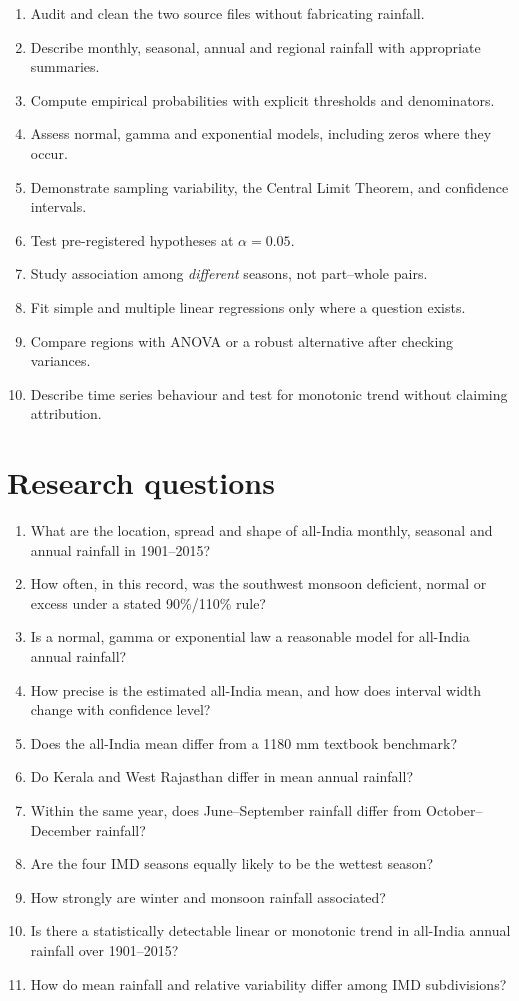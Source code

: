 \documentclass[
]{article}
\providecommand{\tightlist}{%
  \setlength{\itemsep}{0pt}\setlength{\parskip}{0pt}}
\begin{document}
\begin{enumerate}
\def\labelenumi{\arabic{enumi}.}
\tightlist
\item
  Audit and clean the two source files without fabricating rainfall.
\item
  Describe monthly, seasonal, annual and regional rainfall with
  appropriate summaries.
\item
  Compute empirical probabilities with explicit thresholds and
  denominators.
\item
  Assess normal, gamma and exponential models, including zeros where
  they occur.
\item
  Demonstrate sampling variability, the Central Limit Theorem, and
  confidence intervals.
\item
  Test pre-registered hypotheses at \(\alpha = 0.05\).
\item
  Study association among \emph{different} seasons, not part--whole
  pairs.
\item
  Fit simple and multiple linear regressions only where a question
  exists.
\item
  Compare regions with ANOVA or a robust alternative after checking
  variances.
\item
  Describe time series behaviour and test for monotonic trend without
  claiming attribution.
\end{enumerate}

\section{Research questions}\label{research-questions}

\begin{enumerate}
\def\labelenumi{\arabic{enumi}.}
\tightlist
\item
  What are the location, spread and shape of all-India monthly, seasonal
  and annual rainfall in 1901--2015?
\item
  How often, in this record, was the southwest monsoon deficient, normal
  or excess under a stated 90\%/110\% rule?
\item
  Is a normal, gamma or exponential law a reasonable model for all-India
  annual rainfall?
\item
  How precise is the estimated all-India mean, and how does interval
  width change with confidence level?
\item
  Does the all-India mean differ from a 1180 mm textbook benchmark?
\item
  Do Kerala and West Rajasthan differ in mean annual rainfall?
\item
  Within the same year, does June--September rainfall differ from
  October--December rainfall?
\item
  Are the four IMD seasons equally likely to be the wettest season?
\item
  How strongly are winter and monsoon rainfall associated?
\item
  Is there a statistically detectable linear or monotonic trend in
  all-India annual rainfall over 1901--2015?
\item
  How do mean rainfall and relative variability differ among IMD
  subdivisions?
\end{enumerate}
\end{document}
